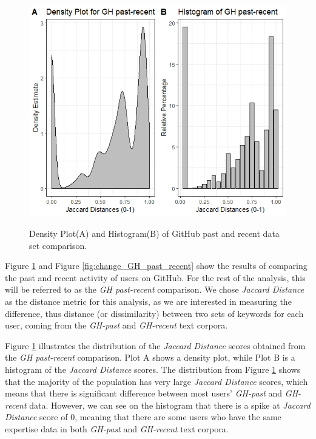         \begin{figure}
          \centering
          \includegraphics[width=\textwidth]{figures/GH_past-recent.jpeg}\\
          \caption{Density Plot(A) and Histogram(B) of GitHub past and recent data set comparison.}
          \label{fig:GH_past_recent}
        \end{figure}
        
        Figure \ref{fig:GH_past_recent} and Figure \ref{fig:change_GH_past_recent} show the results of comparing the past and recent activity of users on GitHub. For the rest of the analysis, this will be referred to as the \emph{GH past-recent} comparison. We chose \emph{Jaccard Distance} as the distance metric for this analysis, as we are interested in measuring the difference, thus distance (or dissimilarity) between two sets of keywords for each user, coming from the \emph{GH-past} and \emph{GH-recent} text corpora. 
        
        Figure \ref{fig:GH_past_recent} illustrates the distribution of the \emph{Jaccard Distance} scores obtained from the \emph{GH past-recent} comparison. Plot A shows a density plot, while Plot B is a histogram of the \emph{Jaccard Distance} scores. The distribution from Figure \ref{fig:GH_past_recent} shows that the majority of the population has very large \emph{Jaccard Distance} scores, which means that there is significant difference between most users' \emph{GH-past} and \emph{GH-recent} data. However, we can see on the histogram that there is a spike at \emph{Jaccard Distance} score of 0, meaning that there are some users who have the same expertise data in both \emph{GH-past} and \emph{GH-recent} text corpora.
        
